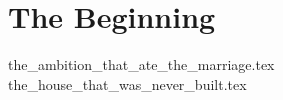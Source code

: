 \part{The Beginning}

{the_ambition_that_ate_the_marriage.tex}
{the_house_that_was_never_built.tex}



